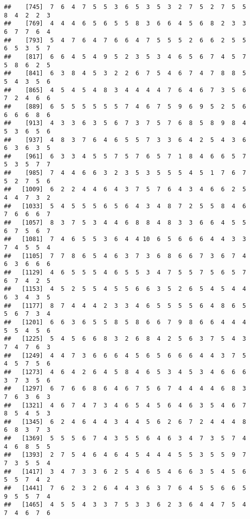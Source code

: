 \documentclass[
]{book}
\begin{document}
\begin{verbatim}
##    [745]  7  6  4  7  5  5  3  6  5  3  5  3  2  7  5  2  7  5  5  8  4  2  2  3
##    [769]  4  4  4  6  5  6  5  5  8  3  6  6  4  5  6  8  2  3  3  6  7  7  6  4
##    [793]  5  4  7  6  4  7  6  6  4  7  5  5  5  2  6  6  2  5  5  6  5  3  5  7
##    [817]  6  6  4  5  4  9  5  2  3  5  3  4  6  5  6  7  4  5  7  5  8  6  2  5
##    [841]  6  3  8  4  5  3  2  2  6  7  5  4  6  7  4  7  8  8  5  5  4  3  5  6
##    [865]  4  5  4  5  4  8  3  4  4  4  4  7  6  4  6  7  3  5  6  7  2  4  6  6
##    [889]  6  5  5  5  5  5  5  7  4  6  7  5  9  6  9  5  2  5  6  6  6  6  8  6
##    [913]  4  3  3  6  3  5  6  7  3  7  5  7  6  8  5  8  9  8  4  5  3  6  5  6
##    [937]  4  8  3  7  6  4  6  5  5  7  3  3  6  4  2  5  4  3  6  6  3  6  3  5
##    [961]  6  3  3  4  5  5  7  5  7  6  5  7  1  8  4  6  6  5  7  5  3  5  7  7
##    [985]  7  4  4  6  6  3  2  3  5  3  5  5  5  4  5  1  7  6  7  5  2  7  5  6
##   [1009]  6  2  2  4  4  6  4  3  7  5  7  6  4  3  4  6  6  2  5  4  4  7  3  2
##   [1033]  5  4  5  5  5  6  5  6  4  3  4  8  7  2  5  5  8  4  6  7  6  6  6  7
##   [1057]  8  3  7  5  3  4  4  6  8  8  4  8  3  3  6  6  4  5  5  6  7  5  6  7
##   [1081]  7  4  6  5  5  3  6  4  4 10  6  5  6  6  6  4  4  3  3  7  4  5  5  4
##   [1105]  7  7  8  6  5  4  6  3  7  3  6  8  6  6  7  3  6  7  4  6  3  6  6  6
##   [1129]  4  6  5  5  5  4  6  5  5  3  4  7  5  5  7  5  6  5  7  6  7  4  2  5
##   [1153]  4  5  2  5  5  4  5  5  6  6  3  5  2  6  5  4  5  4  4  6  3  4  3  5
##   [1177]  8  7  4  4  4  2  3  3  4  6  5  5  5  5  6  4  8  6  5  5  6  7  3  4
##   [1201]  6  6  3  6  5  5  8  5  8  6  6  7  9  8  6  6  4  4  4  5  5  4  5  6
##   [1225]  5  4  5  6  6  8  3  2  6  8  4  2  5  6  3  7  5  4  3  7  4  7  6  3
##   [1249]  4  4  7  3  6  6  6  4  5  6  5  6  6  6  4  4  3  7  5  4  5  7  5  6
##   [1273]  4  6  4  2  6  4  5  8  4  6  5  3  4  5  3  4  6  6  6  3  7  3  5  6
##   [1297]  6  7  6  6  8  6  4  6  7  5  6  7  4  4  4  4  6  8  3  7  6  3  6  3
##   [1321]  4  6  7  4  7  3  4  6  5  4  5  6  4  6  3  5  4  6  7  8  5  4  5  3
##   [1345]  6  2  4  6  4  4  3  4  4  5  6  2  6  7  2  4  4  4  8  6  8  3  7  3
##   [1369]  5  5  5  6  7  4  3  5  5  6  4  6  3  4  7  3  5  7  4  4  6  8  5  5
##   [1393]  2  7  5  4  6  4  6  4  5  4  4  4  5  5  3  5  5  9  7  7  3  5  5  4
##   [1417]  3  4  7  3  3  6  2  5  4  6  5  4  6  6  3  5  4  5  6  5  5  7  4  2
##   [1441]  7  6  2  3  2  6  4  4  3  6  3  7  6  4  5  5  6  6  5  9  5  5  7  4
##   [1465]  4  5  5  4  3  3  7  5  3  3  6  2  3  6  4  4  7  5  4  7  4  6  7  6

\end{verbatim}
\end{document}
